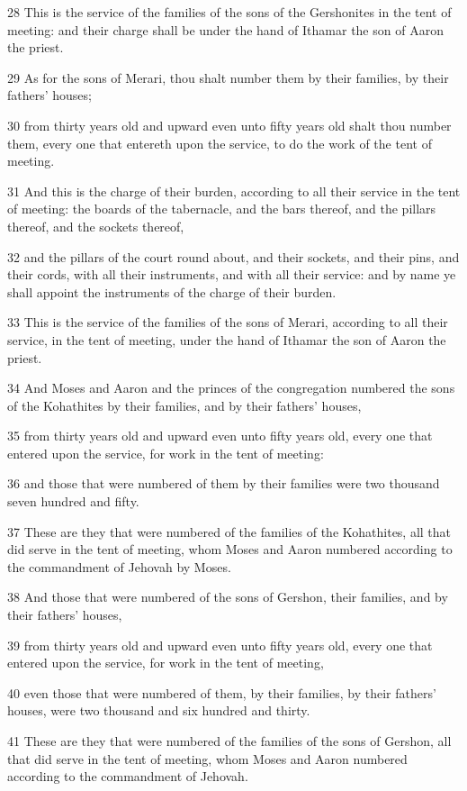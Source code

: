 \par 28 This is the service of the families of the sons of the Gershonites in the tent of meeting: and their charge shall be under the hand of Ithamar the son of Aaron the priest.
\par 29 As for the sons of Merari, thou shalt number them by their families, by their fathers' houses;
\par 30 from thirty years old and upward even unto fifty years old shalt thou number them, every one that entereth upon the service, to do the work of the tent of meeting.
\par 31 And this is the charge of their burden, according to all their service in the tent of meeting: the boards of the tabernacle, and the bars thereof, and the pillars thereof, and the sockets thereof,
\par 32 and the pillars of the court round about, and their sockets, and their pins, and their cords, with all their instruments, and with all their service: and by name ye shall appoint the instruments of the charge of their burden.
\par 33 This is the service of the families of the sons of Merari, according to all their service, in the tent of meeting, under the hand of Ithamar the son of Aaron the priest.
\par 34 And Moses and Aaron and the princes of the congregation numbered the sons of the Kohathites by their families, and by their fathers' houses,
\par 35 from thirty years old and upward even unto fifty years old, every one that entered upon the service, for work in the tent of meeting:
\par 36 and those that were numbered of them by their families were two thousand seven hundred and fifty.
\par 37 These are they that were numbered of the families of the Kohathites, all that did serve in the tent of meeting, whom Moses and Aaron numbered according to the commandment of Jehovah by Moses.
\par 38 And those that were numbered of the sons of Gershon, their families, and by their fathers' houses,
\par 39 from thirty years old and upward even unto fifty years old, every one that entered upon the service, for work in the tent of meeting,
\par 40 even those that were numbered of them, by their families, by their fathers' houses, were two thousand and six hundred and thirty.
\par 41 These are they that were numbered of the families of the sons of Gershon, all that did serve in the tent of meeting, whom Moses and Aaron numbered according to the commandment of Jehovah.
